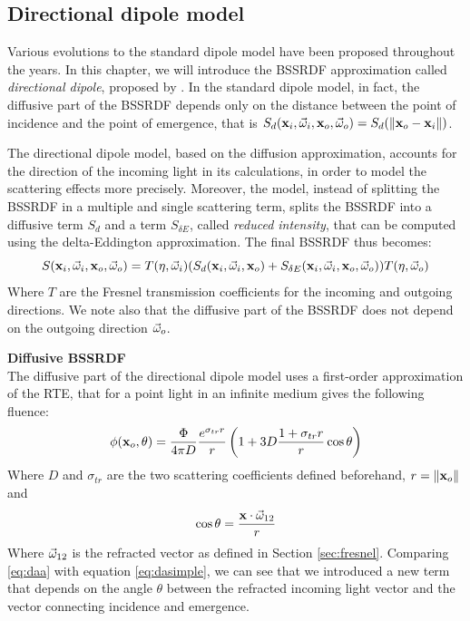 \subsection{Directional dipole model}
 
Various evolutions to the standard dipole model have been proposed throughout the years. In this chapter, we will introduce the BSSRDF approximation called \emph{directional dipole}, proposed by \cite{IMM2013-06646}. In the standard dipole model, in fact, the diffusive part of the BSSRDF depends only on the distance between the point of incidence and the point of emergence, that is $S_d(\mathbf{x}_i, \vec{\omega}_i, \mathbf{x}_o, \vec{\omega}_o) = S_d(\|\mathbf{x}_o - \mathbf{x}_i\|)$. 

The directional dipole model, based on the diffusion approximation, accounts for the direction of the incoming light in its calculations, in order to model the scattering effects more precisely. Moreover, the model, instead of splitting the BSSRDF in a multiple and single scattering term, splits the BSSRDF into a diffusive term $S_d$ and a term $S_{\delta E}$, called \emph{reduced intensity}, that can be computed using the delta-Eddington approximation\cite{delta}. The final BSSRDF thus becomes:
\begin{equation}
S(\mathbf{x}_i, \vec{\omega}_i, \mathbf{x}_o, \vec{\omega}_o) = T(\eta,\vec{\omega}_i) (S_d(\mathbf{x}_i, \vec{\omega}_i, \mathbf{x}_o) + S_{\delta E}(\mathbf{x}_i, \vec{\omega}_i, \mathbf{x}_o, \vec{\omega}_o)) T(\eta,\vec{\omega}_o)
\label{eq:bssrdfgen}
\end{equation}
Where $T$ are the Fresnel transmission coefficients for the incoming and outgoing directions. We note also that the diffusive part of the BSSRDF does not depend on the outgoing direction $\vec{\omega}_o$. 

\textbf{Diffusive BSSRDF} \\
The diffusive part of the directional dipole model uses a first-order approximation of the RTE, that for a point light in an infinite medium gives the following fluence:
\begin{equation}
\phi(\mathbf{x}_o, \theta) = \frac{\Phi}{4\pi D} \frac{e^{\sigma_{tr} r}}{r} \left( 1 + 3D\frac{1 + \sigma_{tr} r}{r}\cos\theta\right)
\label{eq:daa}
\end{equation}
Where $D$ and $\sigma_{tr}$ are the two scattering coefficients defined beforehand, $r = \|\mathbf{x}_o\|$ and 
$$
\cos \theta = \frac{\mathbf{x} \cdot \vec{\omega}_{12}}{r}
$$
Where $\vec{\omega}_{12}$ is the refracted vector as defined in Section \ref{sec:fresnel}. Comparing \ref{eq:daa} with equation \ref{eq:dasimple}, we can see that we introduced a new term that depends on the angle $\theta$ between the refracted incoming light vector and the vector connecting incidence and emergence. 

